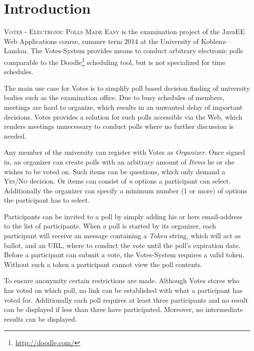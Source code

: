 \section{Introduction}
\textsc{Votes - Electronic Polls Made Easy} is the examination project of the JavaEE Web Applications course, summer term 2014 at the University of Koblenz-Landau.
The Votes-System provides means to conduct arbitrary electronic polls comparable to the Doodle\footnote{\url{http://doodle.com/}} scheduling tool, but is not specialized for time schedules.

The main use case for Votes is to simplify poll based decision finding of university bodies such as the examination office.
Due to busy schedules of members, meetings are hard to organize, which results in an unwanted delay of important decisions.
Votes provides a solution for such polls accessible via the Web, which renders meetings unnecessary to conduct polls where no further discussion is needed.

Any member of the university can register with Votes as \textit{Organizer}.
Once signed in, an organizer can create polls with an arbitrary amount of \textit{Items} he or she wishes to be voted on.
Such items can be questions, which only demand a \textsc{Yes/No} decision.
Or items can consist of \textit{n} options a participant can select.
Additionally the organizer can specify a minimum number (1 or more) of options the participant has to select.

Participants can be invited to a poll by simply adding his or hers email-address to the list of participants.
When a poll is started by its organizer, each participant will receive an message containing a \textit{Token} string, which will act as ballot, and an URL, where to conduct the vote until the poll's expiration date.
Before a participant can submit a vote, the Votes-System requires a valid token.
Without such a token a participant cannot view the poll contents.

To ensure anonymity certain restrictions are made.
Although Votes stores who has voted on which poll, no link can be established with what a participant has voted for.
Additionally each poll requires at least three participants and no result can be displayed if less than three have participated.
Moreover, no intermediate results can be displayed.
